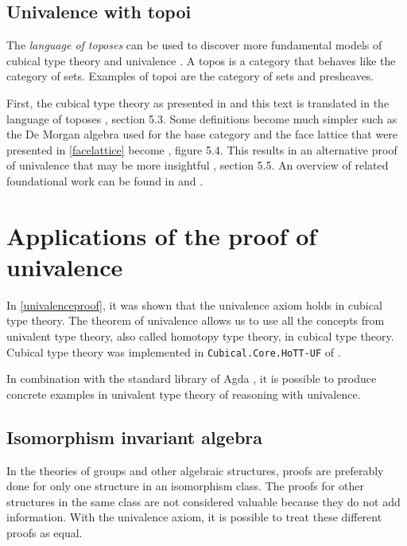 \documentclass[12pt,a4paper,twoside,xetex]{book}
\newcommand{\keyword}[1]{\emph{#1}\index{#1}}
\begin{document}
\subsection{Univalence with topoi}

The \keyword{language of toposes} can be used to discover more fundamental models of cubical type theory and univalence \cite{Orton2019}. A topos is a category that behaves like the category of sets. Examples of topoi are the category of sets and presheaves. 

First, the cubical type theory as presented in \cite{Huber2016} and this text is translated in the  language of toposes \cite{Orton2019}, section 5.3. Some definitions become much simpler such as the De Morgan algebra used for the base category and the face lattice that were presented in \cref{facelattice} become \cite{Orton2019}, figure 5.4. This results in an alternative proof of univalence that may be more insightful \cite{Orton2019}, section 5.5. An overview of related foundational work can be found in \cite{Pitts2018} and \cite{Licata2018}.


\section{Applications of the proof of univalence} \label{applications}

In \cref{univalenceproof}, it was shown that the univalence axiom holds in cubical type theory. The theorem of univalence allows us to use all the concepts from univalent type theory, also called homotopy type theory, in cubical type theory. Cubical type theory was implemented in \texttt{Cubical.Core.HoTT-UF} of \cite{Moertberg2018}.

In combination with the standard library of Agda \cite{Danielsson2019}, it is possible to produce concrete examples in univalent type theory of reasoning with univalence.

\subsection{Isomorphism invariant algebra}\label{magmas}

In the theories of groups and other algebraic structures, proofs are preferably done for only one structure in an isomorphism class. The proofs for other structures in the same class are not considered valuable because they do not add information. With the univalence axiom, it is possible to treat these different proofs as equal. 
\end{document}
